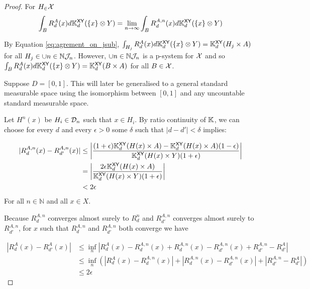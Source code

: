 \begin{proof}
For $H_\in \mathcal{X}$
\begin{align}
	\int_B R^A_d(x) d\mathbb{K}_d^{\mathsf{XY}}(\{x\}\otimes Y) &= \lim_{n\to\infty} \int_B R^{A,n}_d(x) d\mathbb{K}_d^{\mathsf{XY}}(\{x\}\otimes Y)\\
\end{align}

By Equation \ref{eq:agrement_on_jsub}, $\int_{H_j} R^A_d(x) d\mathbb{K}_d^{\mathsf{XY}}(\{x\}\otimes Y) = \mathbb{K}_{d}^{\mathsf{XY}}(H_j\times A)$ for all $H_j\in \cup{n\in \mathbb{N}}\mathcal{J}_n$. However, $\cup{n\in \mathbb{N}}\mathcal{J}_n$ is a p-system for $\mathcal{X}$ and so $\int_{B} R^A_d(x) d\mathbb{K}_d^{\mathsf{XY}}(\{x\}\otimes Y) = \mathbb{K}_{d}^{\mathsf{XY}}(B\times A)$ for all $B\in \mathcal{X}$.

Suppose $D=[0,1]$. This will later be generalised to a general standard measurable space using the isomorphism between $[0,1]$ and any uncountable standard measurable space.

Let $H^n(x)$ be $H_i\in\mathcal{D}_n$ such that $x\in H_i$. By ratio continuity of $\mathbb{K}$, we can choose for every $d$ and every $\epsilon>0$ some $\delta$ such that $|d-d'|<\delta$ implies:

\begin{align}
	|R^{A,n}_d(x)-R^{A,n}_{d'}(x)| &\leq \left|\frac{(1+\epsilon)\mathbb{K}_d^{\mathsf{XY}}(H(x)\times A)-\mathbb{K}_d^{\mathsf{XY}}(H(x)\times A)(1-\epsilon)}{\mathbb{K}_d^{\mathsf{XY}}(H(x)\times Y)(1+\epsilon)} \right|\\
	&= \left|\frac{2\epsilon\mathbb{K}_d^{\mathsf{XY}}(H(x)\times A)}{\mathbb{K}_d^{\mathsf{XY}}(H(x)\times Y)(1+\epsilon)}\right|\\
	&< 2\epsilon
\end{align}
For all $n\in \mathbb{N}$ and all $x\in X$.

Because $R^{A,n}_d$ converges almost surely to $R^n_d$ and $R^{A,n}_{d'}$ converges almost surely to $R^{A,n}_{d'}$, for $x$ such that $R^{A,n}_d$ and $R^{A,n}_{d'}$ both converge we have

\begin{align}
	|R^{A}_d(x)-R^{A}_{d'}(x)| &\leq \inf_{n} \left|R^A_d(x)-R^{A,n}_d(x) + R^{A,n}_d(x)-R^{A,n}_{d'}(x) + R^{A,n}_{d'}-R^{A}_{d'}\right|\\
							   &\leq \inf_n \left(|R^A_d(x)-R^{A,n}_d(x)|+|R^{A,n}_d(x)-R^{A,n}_{d'}(x)| + |R^{A,n}_{d'}-R^{A}_{d'}|\right)\\
							   &\leq 2\epsilon
\end{align}


\end{proof}
